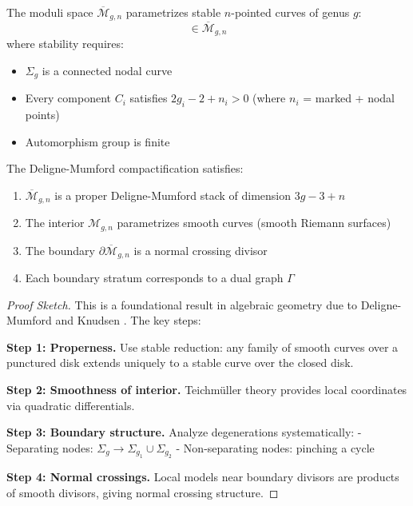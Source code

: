 \begin{definition}
\label{def:deligne-mumford-compactification}
The moduli space $\overline{\mathcal{M}}_{g,n}$ parametrizes stable $n$-pointed curves of genus $g$:
\begin{equation}
[\Sigma_g; p_1, \ldots, p_n] \in \overline{\mathcal{M}}_{g,n}
\end{equation}
where stability requires:
\begin{itemize}
\item $\Sigma_g$ is a connected nodal curve
\item Every component $C_i$ satisfies $2g_i - 2 + n_i > 0$ (where $n_i$ = marked + nodal points)
\item Automorphism group is finite
\end{itemize}
\end{definition}

\begin{theorem}
\label{thm:moduli-structure}
The Deligne-Mumford compactification satisfies:
\begin{enumerate}
\item $\overline{\mathcal{M}}_{g,n}$ is a proper Deligne-Mumford stack of dimension $3g-3+n$
\item The interior $\mathcal{M}_{g,n}$ parametrizes smooth curves (smooth Riemann surfaces)
\item The boundary $\partial \overline{\mathcal{M}}_{g,n}$ is a normal crossing divisor
\item Each boundary stratum corresponds to a dual graph $\Gamma$
\end{enumerate}
\end{theorem}

\begin{proof}[Proof Sketch]
This is a foundational result in algebraic geometry due to Deligne-Mumford \cite{DeligneM69} and Knudsen \cite{Knudsen83}. The key steps:

\textbf{Step 1: Properness.} Use stable reduction: any family of smooth curves over a punctured disk extends uniquely to a stable curve over the closed disk.

\textbf{Step 2: Smoothness of interior.} Teichmüller theory provides local coordinates via quadratic differentials.

\textbf{Step 3: Boundary structure.} Analyze degenerations systematically:
- Separating nodes: $\Sigma_g \to \Sigma_{g_1} \cup \Sigma_{g_2}$
- Non-separating nodes: pinching a cycle

\textbf{Step 4: Normal crossings.} Local models near boundary divisors are products of smooth divisors, giving normal crossing structure.
\end{proof}

